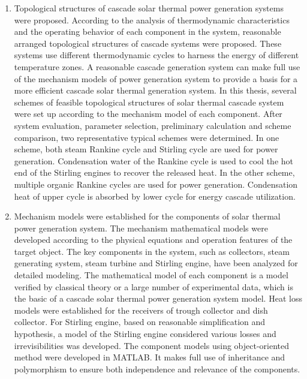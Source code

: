 \begin{enumerate}[label=(\arabic*)]
  \item Topological structures of cascade solar thermal power generation systems were proposed. According to the analysis of thermodynamic characteristics and the operating behavior of each component in the system, reasonable arranged topological structures of cascade systems were proposed. These systems use different thermodynamic cycles to harness the energy of different temperature zones. A reasonable cascade generation system can make full use of the mechanism models of power generation system to provide a basis for a more efficient cascade solar thermal generation system. In this thesis, several schemes of feasible topological structures of solar thermal cascade system were set up according to the mechanism model of each component. After system evaluation, parameter selection, preliminary calculation and scheme comparison, two representative typical schemes were determined. In one scheme, both steam Rankine cycle and Stirling cycle are used for power generation. Condensation water of the Rankine cycle is used to cool the hot end of the Stirling engines to recover the released heat. In the other scheme, multiple organic Rankine cycles are used for power generation. Condensation heat of upper cycle is absorbed by lower cycle for energy cascade utilization.
  \item Mechanism models were established for the components of solar thermal power generation system. The mechanism mathematical models were developed according to the physical equations and operation features of the target object. The key components in the system, such as collectors, steam generating system, steam turbine and Stirling engine, have been analyzed for detailed modeling. The mathematical model of each component is a model verified by classical theory or a large number of experimental data, which is the basic of a cascade solar thermal power generation system model. Heat loss models were established for the receivers of trough collector and dish collector. For Stirling engine, based on reasonable simplification and hypothesis, a model of the Stirling engine considered various losses and irrevisibilities was developed. The component models using object-oriented method were developed in MATLAB. It makes full use of inheritance and polymorphism to ensure both independence and relevance of the components.

\end{enumerate}

